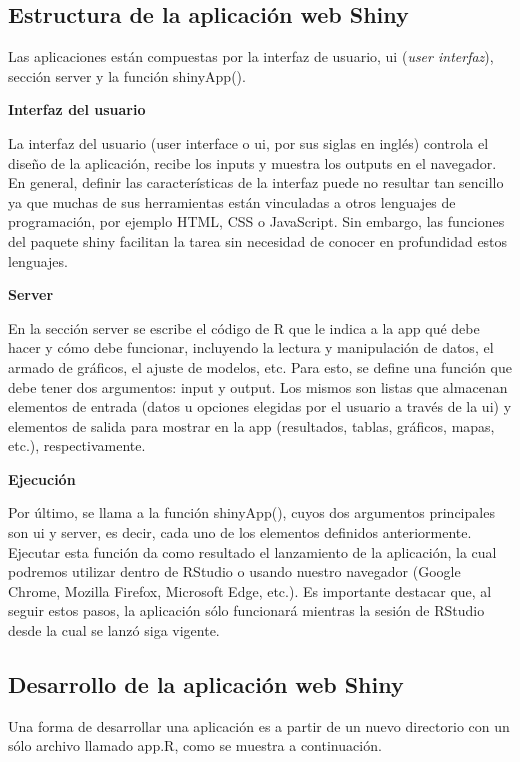 \subsection{Estructura de la aplicación web Shiny}

Las aplicaciones están compuestas por la interfaz de usuario, ui (\emph{user interfaz}), sección server y la función shinyApp(). 


\textbf{Interfaz del usuario}

La interfaz del usuario (user interface o ui, por sus siglas en inglés) controla el diseño de la aplicación, recibe los inputs y muestra los outputs en el navegador. En general, definir las características de la interfaz puede no resultar tan sencillo ya que muchas de sus herramientas están vinculadas a otros lenguajes de programación, por ejemplo HTML, CSS o JavaScript. Sin embargo, las funciones del paquete shiny facilitan la tarea sin necesidad de conocer en profundidad estos lenguajes.

\textbf{Server}

En la sección server se escribe el código de R que le indica a la app qué debe hacer y cómo debe funcionar, incluyendo la lectura y manipulación de datos, el armado de gráficos, el ajuste de modelos, etc. Para esto, se define una función que debe tener dos argumentos: input y output. Los mismos son listas que almacenan elementos de entrada (datos u opciones elegidas por el usuario a través de la ui) y elementos de salida para mostrar en la app (resultados, tablas, gráficos, mapas, etc.), respectivamente.


\textbf{Ejecución}

Por último, se llama a la función shinyApp(), cuyos dos argumentos principales son ui y server, es decir, cada uno de los elementos definidos anteriormente. Ejecutar esta función da como resultado el lanzamiento de la aplicación, la cual podremos utilizar dentro de RStudio o usando nuestro navegador (Google Chrome, Mozilla Firefox, Microsoft Edge, etc.). Es importante destacar que, al seguir estos pasos, la aplicación sólo funcionará mientras la sesión de RStudio desde la cual se lanzó siga vigente.


\subsection{Desarrollo de la aplicación web Shiny}

Una forma de desarrollar una  aplicación es a partir de un nuevo directorio con un sólo archivo llamado app.R, como se muestra a continuación. 

